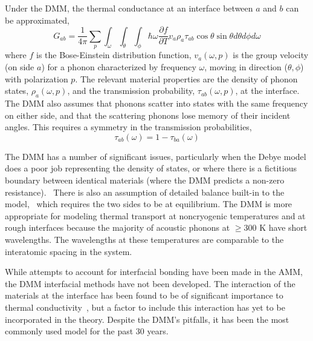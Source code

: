 Under the DMM, the thermal conductance at an interface between $a$ and $b$ can be approximated,  
\begin{equation}
G_{ab} = \frac{1}{4 \pi} \sum_p \int_\omega \int_\theta \int_\phi \hbar \omega \frac{\partial f}{\partial T}  v_a  \rho_a  \tau_{ab} \cos\theta \sin\theta d\theta d\phi d\omega
\end{equation}
where $f$ is the Bose-Einstein distribution function, $v_a(\omega, p)$ is the group velocity (on side $a$) for a phonon characterized by frequency $\omega$, moving in direction ($\theta, \phi$) with polarization $p$.  The relevant material properties are the density of phonon states, $\rho_a(\omega, p)$, and the transmission probability, $\tau_{ab}(\omega, p)$, at the interface.~\cite{Swartz:1989uq,Reddy:2005fk,Monachon2016}  The DMM also assumes that phonons scatter into states with the same frequency on either side, and that the scattering phonons lose memory of their incident angles.  This requires a symmetry in the transmission probabilities,
\begin{equation}
\tau_{ab}(\omega) = 1 - \tau_{ba}(\omega)
\end{equation}

The DMM has a number of significant issues, particularly when the Debye model does a poor job representing the density of states, or where there is a fictitious boundary between identical materials (where the DMM predicts a non-zero resistance).~\cite{Monachon2016}  There is also an assumption of detailed balance built-in to the model,~\cite{Chen2005} which requires the two sides to be at equilibrium.
The DMM is more appropriate for modeling thermal transport at noncryogenic temperatures and at rough interfaces because the majority of acoustic phonons at $\geq$300 K have short wavelengths. The wavelengths at these temperatures are comparable to the interatomic spacing in the system.

While attempts to account for interfacial bonding have been made in the AMM, the DMM interfacial methods have not been developed.
The interaction of the materials at the interface has been found to be of significant importance to thermal conductivity~\cite{Beechem2007, Hopkins-surf-rough, Hopkins-inelastic}, but a factor to include this interaction has yet to be incorporated in the theory.
Despite the DMM's pitfalls, it has been the most commonly used model for the past 30 years. ~\cite{Cahill2006, Stoner1993, Stevens2005, Cahill2011}

